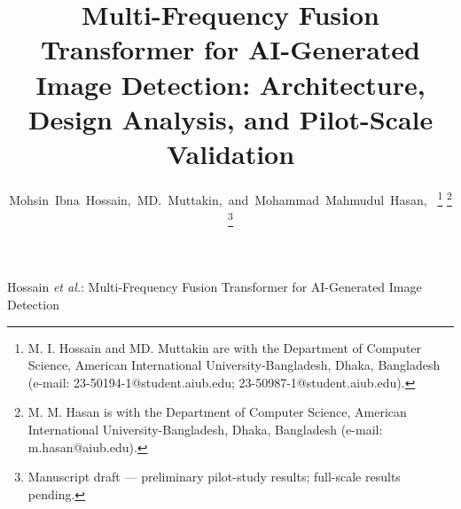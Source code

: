 \documentclass[journal]{IEEEtran}
\begin{document}
\title{Multi-Frequency Fusion Transformer for AI-Generated Image Detection: Architecture, Design Analysis, and Pilot-Scale Validation}

\author{Mohsin~Ibna~Hossain,~MD.~Muttakin,~and~Mohammad~Mahmudul~Hasan,~%
\thanks{M. I. Hossain and MD. Muttakin are with the Department of Computer Science, American International University-Bangladesh, Dhaka, Bangladesh (e-mail: 23-50194-1@student.aiub.edu; 23-50987-1@student.aiub.edu).}%
\thanks{M. M. Hasan is with the Department of Computer Science, American International University-Bangladesh, Dhaka, Bangladesh (e-mail: m.hasan@aiub.edu).}%
\thanks{Manuscript draft --- preliminary pilot-study results; full-scale results pending.}}

%
{Hossain \MakeLowercase{\textit{et al.}}: Multi-Frequency Fusion Transformer for AI-Generated Image Detection}

\maketitle
\end{document}
